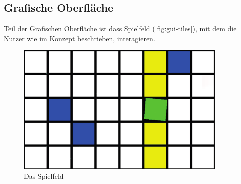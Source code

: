 \subsection{Grafische Oberfläche}

Teil der Grafischen Oberfläche ist dass Spielfeld (\autoref{fig:gui-tiles}), mit dem die Nutzer wie im Konzept beschrieben, interagieren.

\begin{figure}[htbp] 
  \centering
     \includegraphics[width=0.9\textwidth]{images/gui-tiles}
  \caption{Das Spielfeld}
  \label{fig:gui-tiles}
\end{figure}